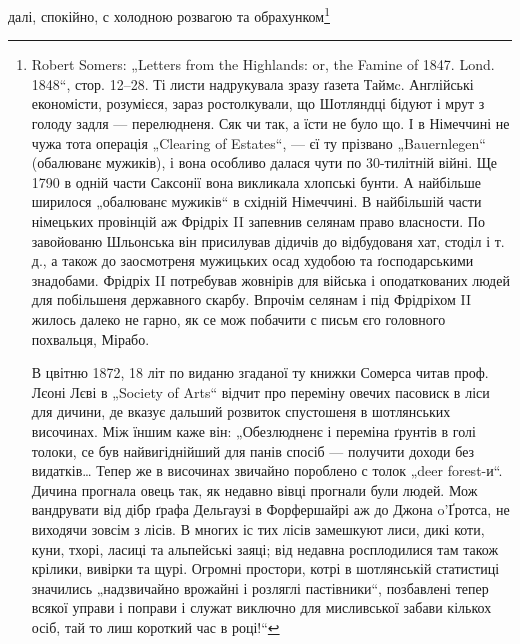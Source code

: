 далі, спокійно, с холодною розвагою та обрахунком\footnote{
Robert Somers: „Letters from the Highlands: or, the Famine of 1847. Lond. 1848“, стор. 12--28. Ті
листи надрукувала зразу ґазета Таймc. Англійські економісти, розумієся, зараз ростолкували, що
Шотляндці бідуют і мрут з голоду задля — перелюдненя. Сяк чи так, а їсти не було що. І в Німеччині
не чужа тота операція „Clearing of Estates“, — єї ту прізвано „Bauernlegen“ (обалюванє мужиків), і
вона особливо далася чути по 30-тилітній війні. Ще 1790 в одній части Саксонії вона викликала хлопські бунти. А найбільше
ширилося „обалюванє мужиків“ в східній Німеччині. В найбільшій части німецьких провінцій аж Фрідріх
II запевнив селянам право власности. По завойованю Шльонська він присилував дідичів до відбудованя
хат, стоділ і т. д., а також до заосмотреня мужицьких осад худобою та ґосподарськими знадобами.
Фрідріх II потребував жовнірів для війська і оподаткованих людей для побільшеня державного
скарбу. Впрочім селянам і під Фрідріхом II жилось далеко не гарно, як се мож побачити с письм єго
головного похвальця, Мірабо.

В цвітню 1872, 18 літ по виданю згаданої ту книжки Сомерса читав проф. Лєоні Лєві в „Society of
Arts“ відчит про переміну овечих пасовиск в ліси для дичини, де вказує дальший розвиток спустошеня в
шотлянських височинах. Між їншим каже він: „Обезлюдненє і переміна ґрунтів в голі толоки, се був
найвигіднійший для панів спосіб — получити доходи без видатків\dots{} Тепер же в височинах звичайно
пороблено с толок „deer forest-и“. Дичина прогнала овець так, як недавно вівці прогнали були людей. Мож вандрувати від
дібр ґрафа Дельгаузі в Форфершайрі аж до Джона o’Ґротса, не виходячи зовсім з лісів. В многих іс
тих лісів замешкуют лиси, дикі коти, куни, тхорі, ласиці та альпейські заяці; від недавна
росплодилися там також крілики, вивірки та щурі. Огромні простори, котрі в шотлянській статистиці
значились „надзвичайно врожайні і розляглі пастівники“, позбавлені тепер всякої управи і поправи і служат виключно для мисливської
забави кількох осіб, тай то лиш короткий час в році!“

}
